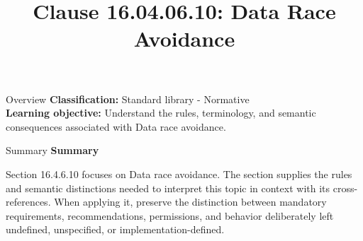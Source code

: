 \documentclass[10pt,letterpaper]{article}
\title{Clause 16.04.06.10: Data Race Avoidance}
\author{}
\date{}
\begin{document}
\maketitle
\begin{CornellOverviewBox}{Overview}
\textbf{Classification:} Standard library - Normative\\[2pt]
\textbf{Learning objective:} Understand the rules, terminology, and semantic consequences associated with Data race avoidance.
\end{CornellOverviewBox}\begin{CornellSummaryBox}{Summary}
{\sffamily\bfseries\color{Accent} Summary}\par\vspace{3pt}Section 16.4.6.10 focuses on Data race avoidance. The section supplies the rules and semantic distinctions needed to interpret this topic in context with its cross-references. When applying it, preserve the distinction between mandatory requirements, recommendations, permissions, and behavior deliberately left undefined, unspecified, or implementation-defined.
\end{CornellSummaryBox}
\end{document}

